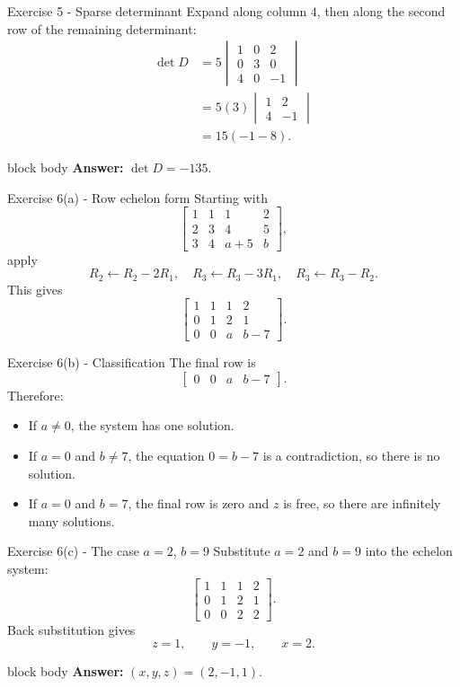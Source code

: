 \documentclass[aspectratio=169]{beamer}
\newcommand{\answerbox}[1]{%
  \begin{beamercolorbox}[sep=1.0ex,wd=\linewidth]{block body}
    \textbf{Answer:} #1
  \end{beamercolorbox}}
\begin{document}
\begin{frame}{Exercise 5 - Sparse determinant}
Expand along column $4$, then along the second row of the remaining determinant:
\begin{align*}
\det D
&=5\begin{vmatrix}1&0&2\\0&3&0\\4&0&-1\end{vmatrix}\\
&=5(3)\begin{vmatrix}1&2\\4&-1\end{vmatrix}\\
&=15(-1-8).
\end{align*}
\answerbox{$\boxed{\det D=-135}$.}
\end{frame}

\begin{frame}{Exercise 6(a) - Row echelon form}
\small
Starting with
\[
\left[\begin{array}{ccc|c}
1&1&1&2\\
2&3&4&5\\
3&4&a+5&b
\end{array}\right],
\]
apply
\[
R_2\leftarrow R_2-2R_1,
\quad
R_3\leftarrow R_3-3R_1,
\quad
R_3\leftarrow R_3-R_2.
\]
This gives
\[
\boxed{\left[\begin{array}{ccc|c}
1&1&1&2\\
0&1&2&1\\
0&0&a&b-7
\end{array}\right]}.
\]
\end{frame}

\begin{frame}{Exercise 6(b) - Classification}
The final row is
\[
\begin{bmatrix}0&0&a&b-7\end{bmatrix}.
\]
Therefore:
\begin{itemize}
  \item If $a\ne0$, the system has one solution.
  \item If $a=0$ and $b\ne7$, the equation $0=b-7$ is a contradiction, so there is no solution.
  \item If $a=0$ and $b=7$, the final row is zero and $z$ is free, so there are infinitely many solutions.
\end{itemize}
\end{frame}

\begin{frame}{Exercise 6(c) - The case $a=2$, $b=9$}
Substitute $a=2$ and $b=9$ into the echelon system:
\[
\left[\begin{array}{ccc|c}
1&1&1&2\\
0&1&2&1\\
0&0&2&2
\end{array}\right].
\]
Back substitution gives
\[
z=1,
\qquad y=-1,
\qquad x=2.
\]
\answerbox{$\boxed{(x,y,z)=(2,-1,1)}$.}
\end{frame}
\end{document}
